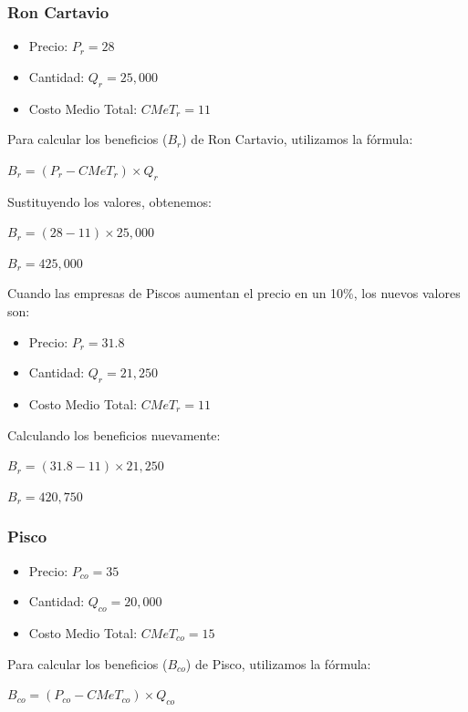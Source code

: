 \documentclass[
  letterpaper,
  DIV=11,
  numbers=noendperiod]{scrartcl}
\providecommand{\tightlist}{%
  \setlength{\itemsep}{0pt}\setlength{\parskip}{0pt}}\usepackage{longtable,booktabs,array}
\begin{document}
\hypertarget{ron-cartavio}{%
\subsubsection{Ron Cartavio}\label{ron-cartavio}}

\begin{itemize}
\tightlist
\item
  Precio: \(P_r = 28\)
\item
  Cantidad: \(Q_r = 25,000\)
\item
  Costo Medio Total: \(CMeT_r = 11\)
\end{itemize}

Para calcular los beneficios (\(B_r\)) de Ron Cartavio, utilizamos la
fórmula:

\(B_r = (P_r - CMeT_r) \times Q_r\)

Sustituyendo los valores, obtenemos:

\(B_r = (28 - 11) \times 25,000\)

\(B_r = 425,000\)

Cuando las empresas de Piscos aumentan el precio en un 10\%, los nuevos
valores son:

\begin{itemize}
\tightlist
\item
  Precio: \(P_r = 31.8\)
\item
  Cantidad: \(Q_r = 21,250\)
\item
  Costo Medio Total: \(CMeT_r = 11\)
\end{itemize}

Calculando los beneficios nuevamente:

\(B_r = (31.8 - 11) \times 21,250\)

\(B_r = 420,750\)

\hypertarget{pisco}{%
\subsubsection{Pisco}\label{pisco}}

\begin{itemize}
\tightlist
\item
  Precio: \(P_{co} = 35\)
\item
  Cantidad: \(Q_{co} = 20,000\)
\item
  Costo Medio Total: \(CMeT_{co} = 15\)
\end{itemize}

Para calcular los beneficios (\(B_{co}\)) de Pisco, utilizamos la
fórmula:

\(B_{co} = (P_{co} - CMeT_{co}) \times Q_{co}\)
\end{document}
